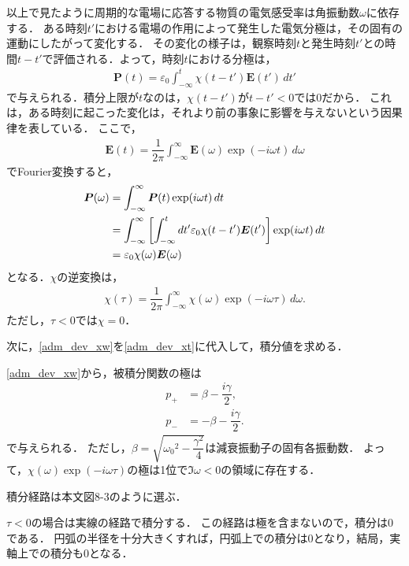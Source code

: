 以上で見たように周期的な電場に応答する物質の電気感受率は角振動数$\omega$に依存する．
ある時刻$t'$における電場の作用によって発生した電気分極は，その固有の運動にしたがって変化する．
その変化の様子は，観察時刻$t$と発生時刻$t'$との時間$t-t'$で評価される．よって，時刻$t$における分極は，
\begin{align}
  \boldsymbol{P}(t)=\varepsilon_0\int^t_{-\infty} \chi(t-t')\boldsymbol{E}(t') \, dt' \label{adm_dev_Pt}
\end{align}
で与えられる．積分上限が$t$なのは，$\chi(t-t')$が$t-t' < 0$では0だから．
これは，ある時刻に起こった変化は，それより前の事象に影響を与えないという因果律を表している．
ここで，
\begin{align}
  \boldsymbol{E}(t)=\dfrac{1}{2\pi}\int^\infty_{-\infty}\boldsymbol{E}(\omega)\exp(-i\omega{}t) \, d\omega
\end{align}
でFourier変換すると，
\begin{align}
  \boldsymbol{P}(\omega) &= \int^\infty_{-\infty}\boldsymbol{P}(t)\exp(i\omega{}t) \, dt\notag \\
  &= \int^\infty_{-\infty}\left[\int^t_{-\infty}dt'\varepsilon_0\chi(t-t')\boldsymbol{E}(t')\right]\exp(i\omega{}t) \, dt\notag \\
  &= \varepsilon_0\chi(\omega)\boldsymbol{E}(\omega)
\end{align}
となる．$\chi$の逆変換は，
\begin{align}
  \chi(\tau)=\dfrac{1}{2\pi}\int^\infty_{-\infty}\chi(\omega)\exp(-i\omega\tau) \, d\omega. \label{adm_dev_xt}
\end{align}
ただし，$\tau < 0$では$\chi=0$．

次に，\eqref{adm_dev_xw}を\eqref{adm_dev_xt}に代入して，積分値を求める．

\eqref{adm_dev_xw}から，被積分関数の極は
\begin{align}
  p_+ &= \beta-\dfrac{i\gamma}{2}, \label{adm_dev_pole+}\\
  p_- &= -\beta-\dfrac{i\gamma}{2}. \label{adm_dev_pole-}
\end{align}
で与えられる．
ただし，$\beta=\sqrt{{\omega_0}^2-\dfrac{\gamma^2}{4}}$は減衰振動子の固有各振動数．
よって，$\chi(\omega)\exp(-i\omega\tau)$の極は1位で$\Im \omega < 0$の領域に存在する．

積分経路は本文図8-3のように選ぶ．

$\tau < 0$の場合は実線の経路で積分する．
この経路は極を含まないので，積分は$0$である．
円弧の半径を十分大きくすれば，円弧上での積分は$0$となり，結局，実軸上での積分も$0$となる．

